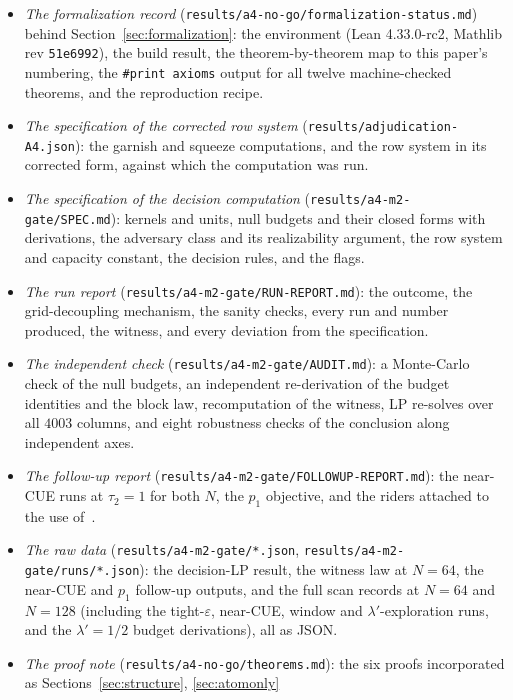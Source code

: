\documentclass[11pt]{article}
\theoremstyle{plain}
\theoremstyle{definition}
\theoremstyle{remark}
\begin{document}
\begin{itemize}
\item \emph{The formalization record}
  (\texttt{results/a4-no-go/formalization-status.md}) behind
  Section~\ref{sec:formalization}: the environment (Lean 4.33.0-rc2, Mathlib rev
  \texttt{51e6992}), the build result, the theorem-by-theorem map to this
  paper's numbering, the \texttt{\#print axioms} output for all twelve
  machine-checked theorems, and the reproduction recipe.
\item \emph{The specification of the corrected row system}
  (\texttt{results/adjudication-A4.json}): the garnish and squeeze
  computations, and the row system in its corrected form, against which the
  computation was run.
\item \emph{The specification of the decision computation}
  (\texttt{results/a4-m2-gate/SPEC.md}): kernels and units, null budgets and
  their closed forms with derivations, the adversary class and its
  realizability argument, the row system and capacity constant, the decision
  rules, and the flags.
\item \emph{The run report} (\texttt{results/a4-m2-gate/RUN-REPORT.md}): the
  outcome, the grid-decoupling mechanism, the sanity checks, every run and
  number produced, the witness, and every deviation from the specification.
\item \emph{The independent check} (\texttt{results/a4-m2-gate/AUDIT.md}): a
  Monte-Carlo check of the null budgets, an independent re-derivation of the
  budget identities and the block law, recomputation of the witness, LP
  re-solves over all $4003$ columns, and eight robustness checks of the
  conclusion along independent axes.
\item \emph{The follow-up report}
  (\texttt{results/a4-m2-gate/FOLLOWUP-REPORT.md}): the near-CUE runs at
  $\tau_2 = 1$ for both $N$, the $p_1$ objective, and the riders attached to the
  use of~\cite{BGSTB24}.
\item \emph{The raw data} (\texttt{results/a4-m2-gate/*.json},
\texttt{results/a4-m2-gate/}\allowbreak\texttt{runs/*.json}): the decision-LP
result, the witness law at $N = 64$, the
  near-CUE and $p_1$ follow-up outputs, and the full scan records at $N = 64$ and
  $N = 128$ (including the tight-$\varepsilon$, near-CUE, window and
  $\lambda'$-exploration runs, and the $\lambda' = 1/2$ budget derivations), all
  as JSON.
\item \emph{The proof note} (\texttt{results/a4-no-go/theorems.md}): the six
  proofs incorporated as Sections~\ref{sec:structure}, \ref{sec:atomonly}

\end{itemize}
\end{document}
